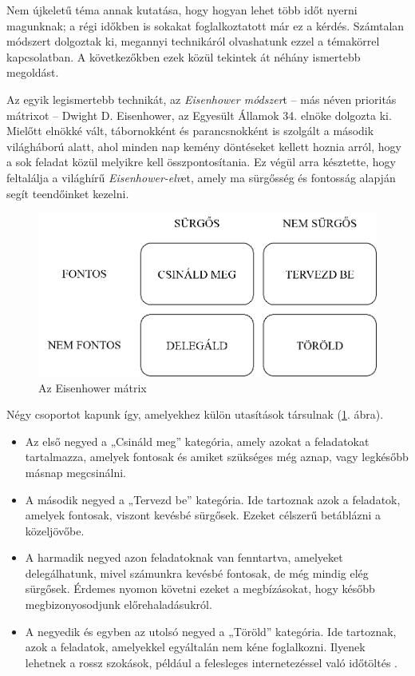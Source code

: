 
Nem újkeletű téma annak kutatása, hogy hogyan lehet több időt nyerni magunknak; a régi időkben is sokakat foglalkoztatott már ez a kérdés. Számtalan módszert dolgoztak ki, megannyi technikáról olvashatunk ezzel a témakörrel kapcsolatban. A következőkben ezek közül tekintek át néhány ismertebb megoldást.


Az egyik legismertebb technikát, az \textit{Eisenhower módszer}t -- más néven prioritás mátrixot -- Dwight D. Eisenhower, az Egyesült Államok 34. elnöke dolgozta ki. Mielőtt elnökké vált, tábornokként és parancsnokként is szolgált a második világháború alatt, ahol minden nap kemény döntéseket kellett hoznia arról, hogy a sok feladat közül melyikre kell összpontosítania. Ez végül arra késztette, hogy feltalálja a világhírű \textit{Eisenhower-elv}et, amely ma sürgősség és fontosság alapján segít teendőinket kezelni.

\begin{figure}[h]
	\centering
	\includegraphics[scale=0.7]{images/eisenhower.png}
	\caption{Az Eisenhower mátrix}
	\label{fig:eisenhower}
\end{figure}

Négy csoportot kapunk így, amelyekhez külön utasítások társulnak (\ref{fig:eisenhower}. ábra).

\begin{itemize}
\item Az első negyed a „Csináld meg” kategória, amely azokat a feladatokat tartalmazza, amelyek fontosak és amiket szükséges még aznap, vagy legkésőbb másnap megcsinálni.
\item A második negyed a „Tervezd be” kategória. Ide tartoznak azok a feladatok, amelyek fontosak, viszont kevésbé sürgősek. Ezeket célszerű betáblázni a közeljövőbe.
\item A harmadik negyed azon feladatoknak van fenntartva, amelyeket delegálhatunk, mivel számunkra kevésbé fontosak, de még mindig elég sürgősek. Érdemes nyomon követni ezeket a megbízásokat, hogy később megbizonyosodjunk előrehaladásukról.
\item A negyedik és egyben az utolsó negyed a „Töröld” kategória. Ide tartoznak, azok a feladatok, amelyekkel egyáltalán nem kéne foglalkozni. Ilyenek lehetnek a rossz szokások, például a felesleges internetezéssel való időtöltés \cite{matrix}.
\end{itemize}
 
